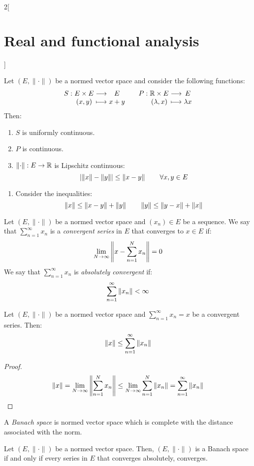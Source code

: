 \documentclass[../../../main_math.tex]{subfiles}
\begin{document}
\begin{multicols}{2}[\section{Real and functional analysis}]
\begin{proposition}
  \end{proposition}
  \begin{proposition}\label{RFA:sumproduct_func}
    Let $(E,\|\cdot\|)$ be a normed vector space and consider the following functions:
    $$\function{S}{E\times E}{E}{(x,y)}{x+y}\quad\function{P}{\RR\times E}{E}{(\lambda,x)}{\lambda x}$$ Then:
    \begin{enumerate}
      \item $S$ is uniformly continuous.
      \item $P$ is continuous.
      \item $\left\|\cdot\right\|:E\rightarrow\mathbb{R}$ is Lipschitz continuous: $$\abs{\left\|x\right\|-\left\|y\right\|}\leq\left\|x-y\right\|\qquad\forall x,y\in E$$
    \end{enumerate}
  \end{proposition}
  \begin{sproof}
    \begin{enumerate}
      \doubleitem It follows from the .
      \item Consider the inequalities: $$\left\|x\right\|\leq\left\|x-y\right\|+\left\|y\right\|\qquad\left\|y\right\|\leq\left\|y-x\right\|+\left\|x\right\|$$
    \end{enumerate}
  \end{sproof}
  \begin{definition}
    Let $(E,\|\cdot\|)$ be a normed vector space and $(x_n)\in E$ be a sequence. We say that $\sum_{n=1}^\infty x_n$ is a \emph{convergent series} in $E$ that converges to $x\in E$ if: $$\lim_{N\to\infty}\left\|x-\sum_{n=1}^N x_n\right\|=0 $$
    We say that $\sum_{n=1}^\infty x_n$ is \emph{absolutely convergent} if: $$\sum_{n=1}^\infty\left\|x_n\right\|<\infty$$
  \end{definition}
  \begin{proposition}
    Let $(E,\|\cdot\|)$ be a normed vector space and $\sum_{n=1}^\infty x_n=x$ be a convergent series. Then: $$\left\|x\right\|\leq \sum_{n=1}^\infty\left\|x_n\right\|$$
  \end{proposition}
  \begin{proof}
    $$\left\|x\right\|=\lim_{N\to\infty}\left\|\sum_{n=1}^N x_n\right\|\leq \lim_{N\to\infty}\sum_{n=1}^N\left\|x_n\right\|= \sum_{n=1}^\infty\left\|x_n\right\|$$
  \end{proof}
  \begin{definition}
    A \emph{Banach space} is normed vector space which is complete with the distance associated with the norm.
  \end{definition}
  \begin{theorem}
    Let $(E,\|\cdot\|)$ be a normed vector space. Then, $(E,\|\cdot\|)$ is a Banach space if and only if every series in $E$ that converges absolutely, converges.

\end{theorem}
\end{multicols}
\end{document}
